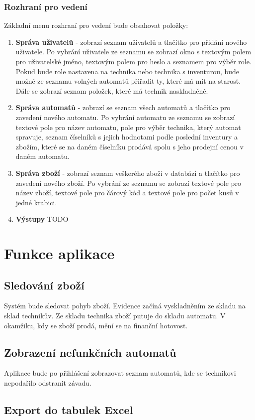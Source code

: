 \documentclass[a4paper,10pt]{article}
\begin{document}
\subsubsection{Rozhraní pro vedení}
Základní menu rozhraní pro vedení bude obsahovat položky:
\begin{enumerate}
	\item \textbf{Správa uživatelů} - zobrazí seznam uživatelů a tlačítko pro přidání nového uživatele. Po vybrání uživatele ze seznamu se zobrazí okno s textovým polem pro uživatelské jméno, textovým polem pro heslo a seznamem pro výběr role. Pokud bude role nastavena na technika nebo technika s inventurou, bude možné ze seznamu volných automatů přiřadit ty, které má mít na starost. Dále se zobrazí seznam položek, které má technik naskladněné.
	\item \textbf{Správa automatů} - zobrazí se seznam všech automatů a tlačítko pro zavedení nového automatu. Po vybrání automatu ze seznamu se zobrazí textové pole pro název automatu, pole pro výběr technika, který automat spravuje, seznam číselníků s jejich hodnotami podle poslední inventury a  zbožím, které se na daném číselníku prodává spolu s jeho prodejní cenou v daném automatu.
	\item \textbf{Správa zboží} - zobrazí seznam veškerého zboží v databázi a tlačítko pro zavedení nového zboží. Po vybrání ze seznamu se zobrazí textové pole pro název zboží, textové pole pro čárový kód a textové pole pro počet kusů v jedné krabici.
	\item \textbf{Výstupy} TODO
\end{enumerate}


\section{Funkce aplikace}
\subsection{Sledování zboží}
Systém bude sledovat pohyb zboží. Evidence začíná vyskladněním ze skladu na sklad technikův. Ze skladu technika zboží putuje do skladu automatu. V okamžiku, kdy se zboží prodá, mění se na finanční hotovost.
\subsection{Zobrazení nefunkčních automatů}
Aplikace bude po přihlášení zobrazovat seznam automatů, kde se technikovi nepodařilo odstranit závadu.
\subsection{Export do tabulek Excel}
\end{document}
